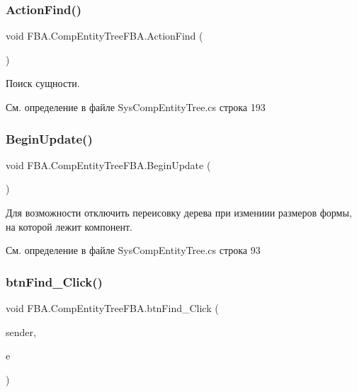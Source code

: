 \subsubsection{\texorpdfstring{Action\+Find()}{ActionFind()}}
{\footnotesize\ttfamily void F\+B\+A.\+Comp\+Entity\+Tree\+F\+B\+A.\+Action\+Find (\begin{DoxyParamCaption}{ }\end{DoxyParamCaption})}



Поиск сущности. 



См. определение в файле Sys\+Comp\+Entity\+Tree.\+cs строка 193

\mbox{\label{class_f_b_a_1_1_comp_entity_tree_f_b_a_a5a15d0b4323f62343af3835c6af39282}} 
\subsubsection{\texorpdfstring{Begin\+Update()}{BeginUpdate()}}
{\footnotesize\ttfamily void F\+B\+A.\+Comp\+Entity\+Tree\+F\+B\+A.\+Begin\+Update (\begin{DoxyParamCaption}{ }\end{DoxyParamCaption})}



Для возможности отключить переисовку дерева при измениии размеров формы, на которой лежит компонент. 



См. определение в файле Sys\+Comp\+Entity\+Tree.\+cs строка 93

\mbox{\label{class_f_b_a_1_1_comp_entity_tree_f_b_a_ad171409fd7ee46e8c5a94fd1044a2449}} 
\subsubsection{\texorpdfstring{btn\+Find\+\_\+\+Click()}{btnFind\_Click()}}
{\footnotesize\ttfamily void F\+B\+A.\+Comp\+Entity\+Tree\+F\+B\+A.\+btn\+Find\+\_\+\+Click (\begin{DoxyParamCaption}\item[{object}]{sender,  }\item[{Event\+Args}]{e }\end{DoxyParamCaption})}




